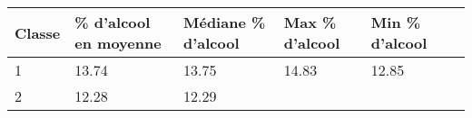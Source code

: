 \documentclass[11pt]{article}
\begin{document}
\begin{longtable}[]{@{}llllll@{}}
\toprule
\begin{minipage}[b]{0.27\columnwidth}\raggedright
Classe\strut
\end{minipage} & \begin{minipage}[b]{0.27\columnwidth}\raggedright
\% d'alcool en moyenne\strut
\end{minipage} & \begin{minipage}[b]{0.10\columnwidth}\raggedright
Médiane \% d'alcool\strut
\end{minipage} & \begin{minipage}[b]{0.06\columnwidth}\raggedright
Max \% d'alcool\strut
\end{minipage} & \begin{minipage}[b]{0.06\columnwidth}\raggedright
Min \% d'alcool\strut
\end{minipage} & \begin{minipage}[b]{0.06\columnwidth}\raggedright
\strut
\end{minipage}\tabularnewline
\midrule
\endhead
\begin{minipage}[t]{0.27\columnwidth}\raggedright
1\strut
\end{minipage} & \begin{minipage}[t]{0.27\columnwidth}\raggedright
13.74\strut
\end{minipage} & \begin{minipage}[t]{0.10\columnwidth}\raggedright
13.75\strut
\end{minipage} & \begin{minipage}[t]{0.06\columnwidth}\raggedright
14.83\strut
\end{minipage} & \begin{minipage}[t]{0.06\columnwidth}\raggedright
12.85\strut
\end{minipage} & \begin{minipage}[t]{0.06\columnwidth}\raggedright
\strut
\end{minipage}\tabularnewline
\begin{minipage}[t]{0.27\columnwidth}\raggedright
2\strut
\end{minipage} & \begin{minipage}[t]{0.27\columnwidth}\raggedright
12.28\strut
\end{minipage} & \begin{minipage}[t]{0.10\columnwidth}\raggedright
12.29\strut
\end{minipage} & \begin{minipage}[t]{0.06\columnwidth}\raggedright

\end{minipage}
\end{longtable}
\end{document}
